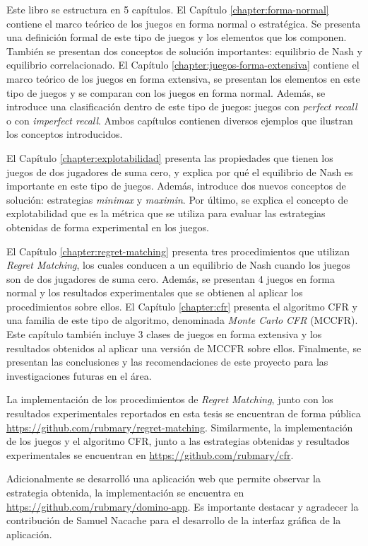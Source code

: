 Este libro se estructura en 5 capítulos. El Capítulo \ref{chapter:forma-normal} contiene el marco teórico de los juegos en forma normal o estratégica. Se presenta una definición formal de este tipo de juegos y los elementos que los componen. También se presentan dos conceptos de solución importantes: equilibrio de Nash y equilibrio correlacionado. El Capítulo \ref{chapter:juegos-forma-extensiva} contiene el marco teórico de los juegos en forma extensiva, se presentan los elementos en este tipo de juegos y se comparan con los juegos en forma normal. Además, se introduce una clasificación dentro de este tipo de juegos: juegos con \textit{perfect recall} o con \textit{imperfect recall}. Ambos capítulos contienen diversos ejemplos que ilustran los conceptos introducidos.

El Capítulo \ref{chapter:explotabilidad} presenta las propiedades que tienen los juegos de dos jugadores de suma cero, y explica por qué el equilibrio de Nash es importante en este tipo de juegos. Además, introduce dos nuevos conceptos de solución: estrategias \textit{minimax} y \textit{maximin}. Por último, se explica el concepto de explotabilidad que es la métrica que se utiliza para evaluar las estrategias obtenidas de forma experimental en los juegos.

El Capítulo \ref{chapter:regret-matching} presenta tres procedimientos que utilizan \textit{Regret Matching}, los cuales conducen a un equilibrio de Nash cuando los juegos son de dos jugadores de suma cero. Además, se presentan 4 juegos en forma normal y los resultados experimentales que se obtienen al aplicar los procedimientos sobre ellos. El Capítulo \ref{chapter:cfr} presenta el algoritmo CFR y una familia de este tipo de algoritmo, denominada \textit{Monte Carlo CFR} (MCCFR). Este capítulo también incluye 3 clases de juegos en forma extensiva y los resultados obtenidos al aplicar una versión de MCCFR sobre ellos. Finalmente, se presentan las conclusiones y las recomendaciones de este proyecto para las investigaciones futuras en el área.

La implementación de los procedimientos de \textit{Regret Matching}, junto con los resultados experimentales reportados en esta tesis se encuentran de forma pública \url{https://github.com/rubmary/regret-matching}. Similarmente, la implementación de los juegos y el algoritmo CFR, junto a las estrategias obtenidas y resultados experimentales se encuentran en \url{https://github.com/rubmary/cfr}.

Adicionalmente se desarrolló una aplicación web que permite observar la estrategia obtenida, la implementación se encuentra en \url{https://github.com/rubmary/domino-app}. Es importante destacar y agradecer la contribución de Samuel Nacache para el desarrollo de la interfaz gráfica de la aplicación.